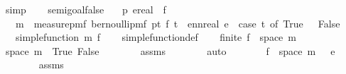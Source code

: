 \begin{isabellebody}
\ simp\isanewline
\ \ \isamarkupfalse%
\isanewline
{}\isamarkupfalse%
%
\endisatagproof
{\isafoldproof}%
%
\isadelimproof
\isanewline
%
\endisadelimproof
\isanewline
\isanewline
{}\isamarkupfalse%
\ semi{\isacharunderscore}{\kern0pt}goal{}{}{\isacharunderscore}{\kern0pt}false{\isacharcolon}{\kern0pt}\isanewline
\ \ \ p{}\ e{\isacharcolon}{\kern0pt}{\isacharcolon}{\kern0pt}real\ \ f\isanewline
\ \ \ {\isachardoublequoteopen}m\ {\isacharequal}{\kern0pt}\ measure{\isacharunderscore}{\kern0pt}pmf\ {\isacharparenleft}{\kern0pt}bernoulli{\isacharunderscore}{\kern0pt}pmf\ p{}{\isacharparenright}{\kern0pt}{\isachardoublequoteclose}{\isachardoublequoteopen}{\isasymAnd}t{\isachardot}{\kern0pt}\ f\ t\ {\isacharequal}{\kern0pt}\ ennreal\ e\ {\isacharasterisk}{\kern0pt}\ {\isacharparenleft}{\kern0pt}case\ t\ of\ True\ {\isasymRightarrow}\ {}{\isacharbar}{\kern0pt}\ False\ {\isasymRightarrow}\ {}{\isacharparenright}{\kern0pt}{\isachardoublequoteclose}\isanewline
\ \ \ {\isachardoublequoteopen}simple{\isacharunderscore}{\kern0pt}function\ m\ f{\isachardoublequoteclose}\isanewline
%
\isadelimproof
\ \ %
\endisadelimproof
%
\isatagproof
{}\isamarkupfalse%
\ simple{\isacharunderscore}{\kern0pt}function{\isacharunderscore}{\kern0pt}def\isanewline
{}\isamarkupfalse%
\isanewline
\ \ \isamarkupfalse%
\ {\isachardoublequoteopen}finite\ {\isacharparenleft}{\kern0pt}f\ {\isacharbackquote}{\kern0pt}\ space\ m{\isacharparenright}{\kern0pt}{\isachardoublequoteclose}\isanewline
\ \ \isamarkupfalse%
{\isacharminus}{\kern0pt}\isanewline
\ \ \ \ \isamarkupfalse%
\ {\isachardoublequoteopen}space\ m\ {\isacharequal}{\kern0pt}\ {\isacharbraceleft}{\kern0pt}True{\isacharcomma}{\kern0pt}\ False{\isacharbraceright}{\kern0pt}{\isachardoublequoteclose}\isanewline
\ \ \ \ \ \ \isamarkupfalse%
\ assms{\isacharparenleft}{\kern0pt}{}{\isacharparenright}{\kern0pt}\isanewline
\ \ \ \ \ \ \isamarkupfalse%
\ auto\isanewline
\ \ \ \ \isamarkupfalse%
\ \isamarkupfalse%
\ {\isachardoublequoteopen}f\ {\isacharbackquote}{\kern0pt}\ space\ m\ {\isacharequal}{\kern0pt}\ {\isacharbraceleft}{\kern0pt}{}{\isacharcomma}{\kern0pt}\ e{\isacharbraceright}{\kern0pt}{\isachardoublequoteclose}\isanewline
\ \ \ \ \ \ \isamarkupfalse%
\ assms{\isacharparenleft}{\kern0pt}{}{\isacharparenright}{\kern0pt}\isanewline

\end{isabellebody}
